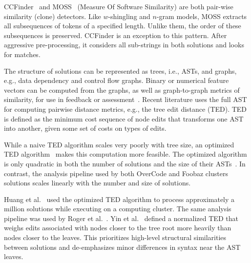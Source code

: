 CCFinder~\cite{CCFinder} and MOSS~\cite{schleimer2003winnowing} (Measure Of Software Similarity) are both pair-wise similarity (clone) detectors. Like $w$-shingling and $n$-gram models, MOSS extracts all subsequences of tokens of a specified length. Unlike them, the order of these subsequences is preserved. CCFinder \cite{CCFinder} is an exception to this pattern. After aggressive pre-processing, it considers all sub-strings in both solutions and looks for matches.


The structure of solutions can be represented as trees, i.e., ASTs, and graphs, e.g., data dependency and control flow graphs. Binary or numerical feature vectors can be computed from the graphs, as well as graph-to-graph metrics of similarity, for use in feedback or assessment~\cite{Robinson:1980,srikant2014system}. Recent literature uses the full AST for computing pairwise distance metrics, e.g., the tree edit distance (TED). TED is defined as the minimum cost sequence of node edits that transforms one AST into another, given some set of costs on types of edits. 


While a naive TED algorithm scales very poorly with tree size, an optimized TED algorithm~\cite{shasha1994exact} makes this computation more feasible. The optimized algorithm is only quadratic in both the number of solutions and the size of their ASTs~\cite{MOOCshop}. In contrast, the analysis pipeline used by both OverCode and Foobaz clusters solutions scales linearly with the number and size of solutions. 

Huang et al.~\cite{MOOCshop} used the optimized TED algorithm to process approximately a million solutions while executing on a computing cluster. The same analysis pipeline was used by Roger et al.~\cite{ACESthesis}. Yin et al.~\cite{yin2015clustering} defined a normalized TED that weighs edits associated with nodes closer to the tree root more heavily than nodes closer to the leaves. This prioritizes high-level structural similarities between solutions and de-emphasizes minor differences in syntax near the AST leaves.

